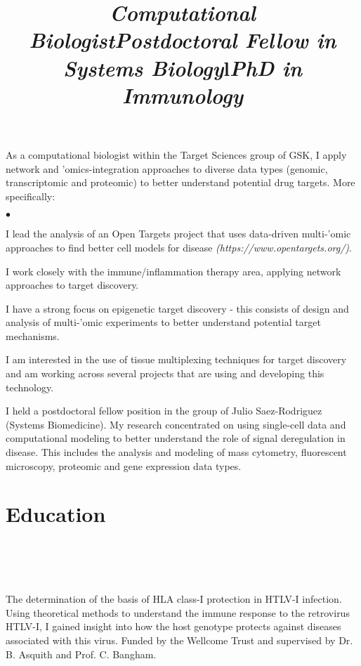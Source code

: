 \documentclass[overlapped, line, 11pt, letterpaper]{res}
\renewenvironment{itemize}{
\begin{list}{$\bullet$}
{\setlength{\itemsep}{0cm}}
}{\end{list}}
\begin{document}
\begin{resume}
\title{\it Computational Biologist} 
\begin{position}
As a computational biologist within the Target Sciences group of GSK, I apply network and 'omics-integration approaches to diverse data types (genomic, transcriptomic and proteomic) to better understand potential drug targets. More specifically:
\begin{itemize}
\item I lead the analysis of an Open Targets project that uses data-driven multi-'omic approaches to find better cell models for disease \emph{(https://www.opentargets.org/)}.
\item I work closely with the immune/inflammation therapy area, applying network approaches to target discovery.
\item I have a strong focus on epigenetic target discovery - this consists of design and analysis of multi-'omic experiments to better understand potential target mechanisms.
\item I am interested in the use of tissue multiplexing techniques for target discovery and am working across several projects that are using and developing this technology.  
\end{itemize}
\end{position}

\title{\it Postdoctoral Fellow in Systems Biology} 
\begin{position}
I held a postdoctoral fellow position in the group of Julio Saez-Rodriguez (Systems Biomedicine). My research concentrated on using single-cell data and computational modeling to better understand the role of signal deregulation in disease. This includes the analysis and modeling of mass cytometry, fluorescent microscopy, proteomic and gene expression data types.
\end{position}

\section{\bf Education}
\begin{formatb}
\title{l} \\
\\
\body \\
\end{formatb}

\title{\it PhD in Immunology} 
\begin{position}
The determination of the basis of HLA class-I protection in HTLV-I infection. Using theoretical methods to understand the immune response to the retrovirus HTLV-I, I gained insight into how the host genotype protects against diseases associated with this virus. Funded by the Wellcome Trust and supervised by Dr. B. Asquith and Prof. C. Bangham.
\end{position}


\end{resume}
\end{document}
